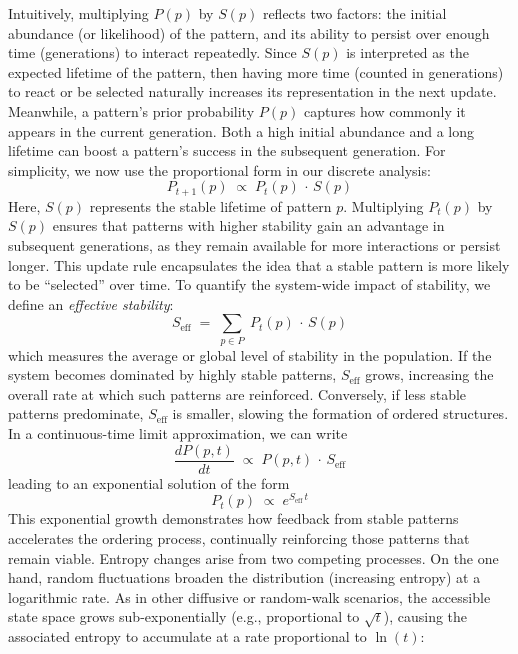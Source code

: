 \documentclass[entropy,article,submit,pdftex,moreauthors]{Definitions/mdpi}
\begin{document}
Intuitively, multiplying $P(p)$ by $S(p)$ reflects two factors: the initial abundance (or likelihood) of the pattern, and its ability to persist over enough time (generations) to interact repeatedly. Since $S(p)$ is interpreted as the expected lifetime of the pattern, then having more time (counted in generations) to react or be selected naturally increases its representation in the next update. Meanwhile, a pattern's prior probability $P(p)$ captures how commonly it appears in the current generation. Both a high initial abundance and a long lifetime can boost a pattern's success in the subsequent generation. For simplicity, we now use the proportional form in our discrete analysis:
\begin{equation}
P_{t+1}(p) \;\propto\; P_t(p)\,\cdot\,S(p)
\end{equation}
Here, $S(p)$ represents the stable lifetime of pattern $p$. Multiplying $P_t(p)$ by $S(p)$ ensures that patterns with higher stability gain an advantage in subsequent generations, as they remain available for more interactions or persist longer. This update rule encapsulates the idea that a stable pattern is more likely to be ``selected'' over time. To quantify the system-wide impact of stability, we define an \emph{effective stability}:
\begin{equation}
S_{\mathrm{eff}} \;=\; \sum_{p \in P}\; P_t(p)\,\cdot\,S(p)
\end{equation}
which measures the average or global level of stability in the population. If the system becomes dominated by highly stable patterns, $S_{\mathrm{eff}}$ grows, increasing the overall rate at which such patterns are reinforced. Conversely, if less stable patterns predominate, $S_{\mathrm{eff}}$ is smaller, slowing the formation of ordered structures. In a continuous-time limit approximation, we can write
\begin{equation}
\frac{dP(p,t)}{dt} \;\propto\; P(p,t)\,\cdot\,S_{\mathrm{eff}}
\end{equation}
leading to an exponential solution of the form
\begin{equation}
P_t(p) \;\propto\; e^{S_{\mathrm{eff}}\,t}
\end{equation}
This exponential growth demonstrates how feedback from stable patterns accelerates the ordering process, continually reinforcing those patterns that remain viable. Entropy changes arise from two competing processes. On the one hand, random fluctuations broaden the distribution (increasing entropy) at a logarithmic rate. As in other diffusive or random-walk scenarios, the accessible state space grows sub-exponentially (e.g., proportional to $\sqrt{t}$), causing the associated entropy to accumulate at a rate proportional to $\ln(t)$:
\end{document}
